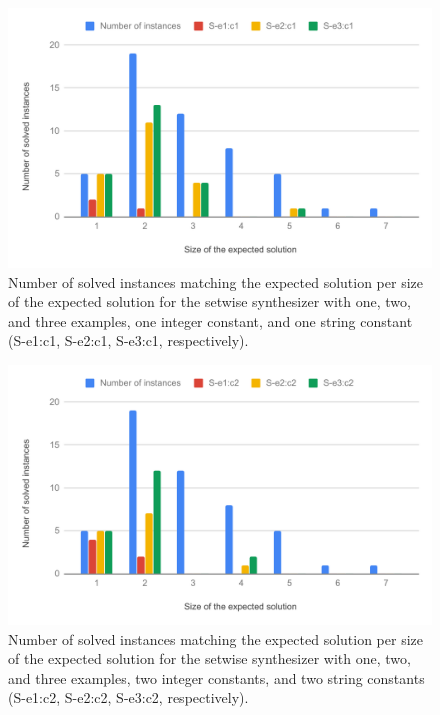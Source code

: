 \begin{figure}
  \centering
  \includegraphics[width=1.0\textwidth]{assets/bar-chart-expected-setwise-c1.pdf}
  \caption{Number of solved instances matching the expected solution per size of
    the expected solution for the setwise synthesizer with one, two, and three
    examples, one integer constant, and one string constant (S-e1:c1, S-e2:c1,
    S-e3:c1, respectively).}
  \label{fig:bar-chart-expected-setwise-c1}
\end{figure}

\begin{figure}
  \centering
  \includegraphics[width=1.0\textwidth]{assets/bar-chart-expected-setwise-c2.pdf}
  \caption{Number of solved instances matching the expected solution per size of
    the expected solution for the setwise synthesizer with one, two, and three
    examples, two integer constants, and two string constants (S-e1:c2, S-e2:c2,
    S-e3:c2, respectively).}
  \label{fig:bar-chart-expected-setwise-c2}
\end{figure}

